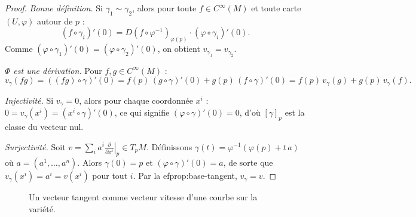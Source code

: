 \documentclass[12pt,a4paper,openany]{book}
\theoremstyle{definition}
\theoremstyle{plain}
\theoremstyle{remark}
\begin{document}
\begin{proof}
\emph{Bonne définition.}
Si $\gamma_1 \sim \gamma_2$, alors pour toute $f \in C^\infty(M)$ et
toute carte $(U, \varphi)$ autour de $p$ :
\[
  (f \circ \gamma_i)'(0) = D(f \circ \varphi^{-1})_{\varphi(p)} \cdot (\varphi \circ \gamma_i)'(0).
\]
Comme $(\varphi \circ \gamma_1)'(0) = (\varphi \circ \gamma_2)'(0)$,
on obtient $v_{\gamma_1} = v_{\gamma_2}$.

\emph{$\Phi$ est une dérivation.}
Pour $f, g \in C^\infty(M)$ :
\[
  v_\gamma(fg) = ((fg) \circ \gamma)'(0) = f(p)\,(g \circ \gamma)'(0) + g(p)\,(f \circ \gamma)'(0)
  = f(p)\,v_\gamma(g) + g(p)\,v_\gamma(f).
\]

\emph{Injectivité.}
Si $v_\gamma = 0$, alors pour chaque coordonnée $x^i$ :
$0 = v_\gamma(x^i) = (x^i \circ \gamma)'(0)$, ce qui signifie $(\varphi \circ \gamma)'(0) = 0$,
d'où $[\gamma]_p$ est la classe du vecteur nul.

\emph{Surjectivité.}
Soit $v = \sum_i a^i \left.\frac{\partial}{\partial x^i}\right|_p \in T_pM$.
Définissons $\gamma(t) = \varphi^{-1}(\varphi(p) + t\,a)$ où $a = (a^1, \ldots, a^n)$.
Alors $\gamma(0) = p$ et $(\varphi \circ \gamma)'(0) = a$, de sorte que
$v_\gamma(x^i) = a^i = v(x^i)$ pour tout $i$. Par la 
ef{prop:base-tangent},
$v_\gamma = v$.
\end{proof}

\begin{figure}[ht]
\centering
{}
\caption{Un vecteur tangent comme vecteur vitesse d'une courbe sur la variété.}\label{fig:vecteur-tangent}
\end{figure}

\end{document}

